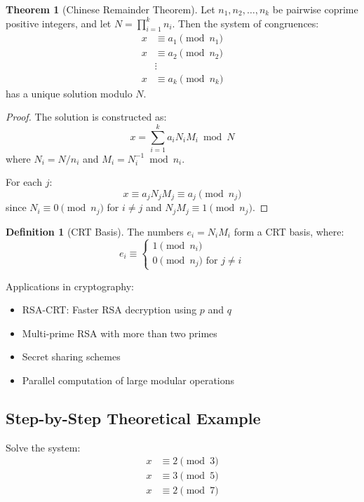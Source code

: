 \documentclass[12pt,a4paper]{article}
\theoremstyle{definition}
\newtheorem{definition}{Definition}[section]
\newtheorem{theorem}{Theorem}[section]
\begin{document}
\begin{theorem}[Chinese Remainder Theorem]
Let $n_1, n_2, \ldots, n_k$ be pairwise coprime positive integers, and let $N = \prod_{i=1}^k n_i$. Then the system of congruences:
\begin{align}
x &\equiv a_1 \pmod{n_1}\\
x &\equiv a_2 \pmod{n_2}\\
&\vdots\\
x &\equiv a_k \pmod{n_k}
\end{align}
has a unique solution modulo $N$.
\end{theorem}

\begin{proof}
The solution is constructed as:
\[x = \sum_{i=1}^k a_i N_i M_i \bmod N\]
where $N_i = N/n_i$ and $M_i = N_i^{-1} \bmod n_i$.

For each $j$:
\[x \equiv a_j N_j M_j \equiv a_j \pmod{n_j}\]
since $N_i \equiv 0 \pmod{n_j}$ for $i \neq j$ and $N_j M_j \equiv 1 \pmod{n_j}$.
\end{proof}

\begin{definition}[CRT Basis]
The numbers $e_i = N_i M_i$ form a CRT basis, where:
\[e_i \equiv \begin{cases}
1 \pmod{n_i}\\
0 \pmod{n_j} \text{ for } j \neq i
\end{cases}\]
\end{definition}

Applications in cryptography:
\begin{itemize}
    \item RSA-CRT: Faster RSA decryption using $p$ and $q$
    \item Multi-prime RSA with more than two primes  
    \item Secret sharing schemes
    \item Parallel computation of large modular operations
\end{itemize}

\subsection{Step-by-Step Theoretical Example}

Solve the system:
\begin{align}
x &\equiv 2 \pmod{3}\\
x &\equiv 3 \pmod{5}\\
x &\equiv 2 \pmod{7}
\end{align}
\end{document}
